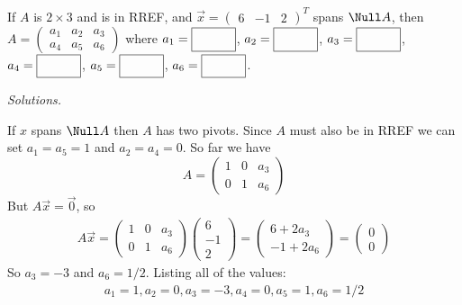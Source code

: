\ifnum {}
    If $A$ is $2 \times 3$ and is in RREF, and $\vec x = \begin{pmatrix} 6&-1&2\end{pmatrix}^T$ spans $\Null A$, then $A=\begin{pmatrix} a_1 & a_2 & a_3 \\ a_4 & a_5 & a_6 \end{pmatrix} $ where 
    $a_1 = \framebox{\strut\hspace{1.0cm}}$, 
    $a_2 = \framebox{\strut\hspace{1.0cm}}$, 
    $a_3 = \framebox{\strut\hspace{1.0cm}}$, 
    $a_4 = \framebox{\strut\hspace{1.0cm}}$,
    $a_5 = \framebox{\strut\hspace{1.0cm}}$,
    $a_6 = \framebox{\strut\hspace{1.0cm}}$.

    \ifnum {} {\color{DarkBlue} \textit{Solutions.} 

    If $x$ spans $\Null A$ then $A$ has two pivots. Since $A$ must also be in RREF we can set $a_1=a_5=1$ and $a_2=a_4 = 0$. So far we have
    $$A = \begin{pmatrix} 1&0&a_3\\0&1&a_6\end{pmatrix}$$
    But $A\vec x = \vec 0$, so 
    \begin{align}
        A\vec x = \begin{pmatrix} 1&0&a_3\\0&1&a_6\end{pmatrix}\begin{pmatrix} 6\\-1\\2\end{pmatrix} = \begin{pmatrix} 6+2a_3 \\-1+2a_6 \end{pmatrix} = \begin{pmatrix} 0\\0 \end{pmatrix}
    \end{align}
    So $a_3 = -3$ and $a_6 = 1/2$. Listing all of the values:
    \begin{align}
        a_1 = 1, a_2 = 0, a_3 = -3, a_4=0, a_5 = 1, a_6 = 1/2
    \end{align}
    } 
   \else
   \fi
\fi     



